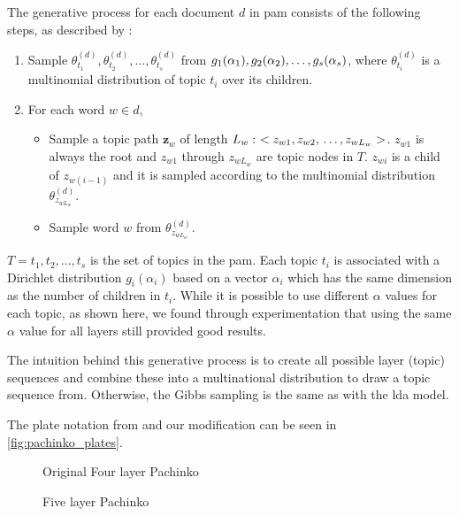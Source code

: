 The generative process for each document $d$ in \gls{pam} consists of the following steps, as described by \citet{li2006pachinko}:
\begin{enumerate}
	\item Sample $\theta_{t_1}^{(d)}, \theta_{t_2}^{(d)}, \dots, \theta_{t_s}^{(d)}$ from $g_1(\alpha_1), g_2(\alpha_2), \dots, \newline g_s(\alpha_s)$, where $\theta_{t_i}^{(d)}$ is a multinomial distribution of topic $t_i$ over its children.
	\item For each word $w \in d$,
	\begin{itemize}
		\item Sample a topic path $\mathbf{z}_w$ of length $L_w:~< z_{w1}, z_{w2},\newline \dots, z_{wL_w} >$. $z_{w1}$ is always the root and $z_{w1}$ through $z_{wL_w}$ are topic nodes in $T$. $z_{wi}$ is a child of $z_{w(i-1)}$ and it is sampled according to the multinomial distribution $\theta_{z_{wL_w}}^{(d)}$.
		\item Sample word $w$ from $\theta_{z_{wL_w}}^{(d)}$.
	\end{itemize}
\end{enumerate}

$T = {t_1, t_2, \dots, t_s}$ is the set of topics in the \gls{pam}. 
Each topic $t_i$ is associated with a Dirichlet distribution $g_i(\alpha_i)$ based on a vector $\alpha_i$ which has the same dimension as the number of children in $t_i$.
While it is possible to use different $\alpha$ values for each topic, as shown here, we found through experimentation that using the same $\alpha$ value for all layers still provided good results.

The intuition behind this generative process is to create all possible layer (topic) sequences and combine these into a multinational distribution to draw a topic sequence from.
Otherwise, the Gibbs sampling is the same as with the \gls{lda} model.

The plate notation from \citet{li2006pachinko} and our modification can be seen in \ref{fig:pachinko_plates}.

\begin{figure*}[ht]
	\centering
	\begin{subfigure}{0.40\textwidth}
		\centering
		\resizebox{\textwidth}{!}{%
			
		}
		\caption{Original Four layer Pachinko}
		\label{fig:four_layer_pachinko}
	\end{subfigure}
	\hspace{1em}
	\begin{subfigure}{0.40\textwidth}
		\centering
		\resizebox{\textwidth}{!}{%
			
		}
		\caption{Five layer Pachinko}
		\label{fig:five_layer_pachinko}
	\end{subfigure}
	\caption{Plate notation for the original four layer \gls{pam} and our five layer \gls{pam}.}
	\label{fig:pachinko_plates}
\end{figure*}
